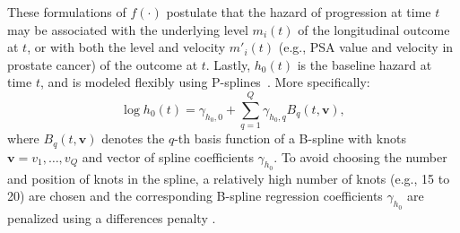 These formulations of $f(\cdot)$ postulate that the hazard of progression at time $t$ may be associated with the underlying level $m_i(t)$ of the longitudinal outcome at $t$, or with both the level and velocity $m'_i(t)$ (e.g., PSA value and velocity in prostate cancer) of the outcome at $t$. Lastly, $h_0(t)$ is the baseline hazard at time $t$, and is modeled flexibly using P-splines~\citep{eilers1996flexible}. More specifically:
\begin{equation*}
\log{h_0(t)} = \gamma_{h_0,0} + \sum_{q=1}^Q \gamma_{h_0,q} B_q(t, \boldsymbol{v}),
\end{equation*}
where $B_q(t, \boldsymbol{v})$ denotes the $q$-th basis function of a B-spline with knots $\boldsymbol{v} = v_1, \ldots, v_Q$ and vector of spline coefficients $\gamma_{h_0}$. To avoid choosing the number and position of knots in the spline, a relatively high number of knots (e.g., 15 to 20) are chosen and the corresponding B-spline regression coefficients $\gamma_{h_0}$ are penalized using a differences penalty \citep{eilers1996flexible}. 

